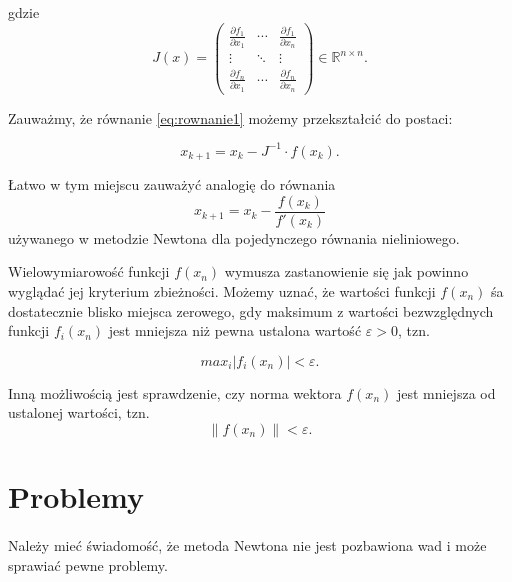 \documentclass{article}
\begin{document}
    gdzie
    \begin{equation*}
      J(x) =
      \begin{pmatrix}
        \frac{\partial f_{1}}{\partial x_{1}} & \cdots & \frac{\partial f_{1}}{\partial x_{n}} \\
        \vdots & \ddots & \vdots \\
        \frac{\partial f_{n}}{\partial x_{1}} & \cdots & \frac{\partial f_{n}}{\partial x_{n}}
      \end{pmatrix} \in \mathbb{R}^{n \times n}.
    \end{equation*}

    Zauważmy, że równanie \eqref{eq:rownanie1} możemy przekształcić do postaci:

    \begin{equation}\label{eq:rownanie2}
      x_{k+1} = x_{k} - J^{-1}\cdot f(x_{k}).
    \end{equation}

    Łatwo w tym miejscu zauważyć analogię do równania
    \begin{equation*}
      x_{k+1} = x_{k} - \frac{f(x_{k})}{f'(x_{k})}
    \end{equation*}
    używanego w metodzie Newtona dla pojedynczego równania nieliniowego.

    Wielowymiarowość funkcji $f(x_{n})$ wymusza zastanowienie się jak powinno wyglądać
    jej kryterium zbieżności.
    Możemy uznać, że wartości funkcji $f(x_{n})$ śa dostatecznie blisko miejsca
    zerowego, gdy maksimum z wartości bezwzględnych funkcji $f_{i}(x_{n})$ jest
    mniejsza niż pewna ustalona wartość $\varepsilon > 0$, tzn.

    \begin{equation*}
      max_{i}|f_{i}(x_{n})| < \varepsilon.
    \end{equation*}

    Inną możliwością jest sprawdzenie, czy norma wektora $f(x_{n})$ jest mniejsza
    od ustalonej wartości, tzn.
    \begin{equation*}
      \lVert f(x_{n})\rVert < \varepsilon.
    \end{equation*}

  \section{Problemy}
    \paragraph{} Należy mieć świadomość, że metoda Newtona nie jest pozbawiona wad
    i może sprawiać pewne problemy.
\end{document}
